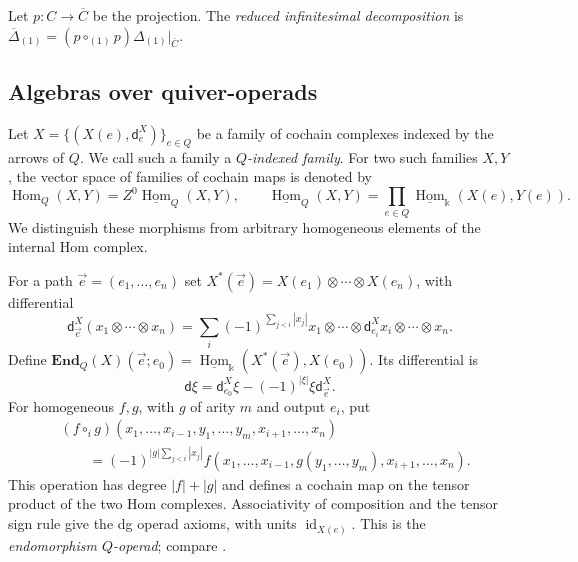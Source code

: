 \documentclass[11pt,letterpaper]{article}
\numberwithin{equation}{section}
\theoremstyle{plain}
\theoremstyle{definition}
\theoremstyle{remark}
\newcommand{\Hom}{\operatorname{Hom}}
\newcommand{\id}{\operatorname{id}}
\begin{document}
Let $p:C\to\overline C$ be the projection. The \textit{reduced infinitesimal decomposition} is
$\overline\Delta_{(1)}=(p\circ_{(1)}p)\Delta_{(1)}|_{\overline C}$.

\subsection{Algebras over quiver-operads}
\label{ss_algebras}
\label{ss_endomrophism_E_operad}
Let $X=\{(X(e),\mathsf d_e^X)\}_{e\in Q}$ be a family of cochain
complexes indexed by the arrows of $Q$. We call such a family a
\textit{$Q$-indexed family}. For two such families $X,Y$, the vector space
of families of cochain maps is denoted by
\begin{equation*} \Hom_Q(X,Y)=Z^0\underline{\operatorname{Hom}}_Q(X,Y),
 \qquad
 \underline{\operatorname{Hom}}_Q(X,Y)
 =\prod_{e\in Q}\underline{\operatorname{Hom}}_{\Bbbk}(X(e),Y(e)).
\end{equation*}
We distinguish these morphisms from arbitrary homogeneous elements of
the internal Hom complex.

For a path $\vec e=(e_1,\ldots,e_n)$ set
$X^*(\vec e)=X(e_1)\otimes\cdots\otimes X(e_n)$, with differential
\begin{equation*} \mathsf d^X_{\vec e}(x_1\otimes\cdots\otimes x_n)
 =\sum_i(-1)^{\sum_{j<i}|x_j|}
 x_1\otimes\cdots\otimes\mathsf d^X_{e_i}x_i\otimes\cdots\otimes x_n.
\end{equation*}
Define
$\mathbf{End}_Q(X)(\vec e;e_0)=
\underline{\operatorname{Hom}}_{\Bbbk}(X^*(\vec e),X(e_0))$.
Its differential is
\begin{equation}\label{widehat_d_eq}
 \mathsf d\xi=\mathsf d^X_{e_0}\xi-(-1)^{|\xi|}\xi\mathsf d^X_{\vec e}.
\end{equation}
For homogeneous $f,g$, with $g$ of arity $m$ and output $e_i$, put
\begin{equation}\label{eq_End_X_hat_composition}
\begin{aligned}
 &(f\circ_i g)(x_1,\ldots,x_{i-1},y_1,\ldots,y_m,x_{i+1},\ldots,x_n)\\
 &\qquad=(-1)^{|g|\sum_{j<i}|x_j|}
 f(x_1,\ldots,x_{i-1},g(y_1,\ldots,y_m),x_{i+1},\ldots,x_n).
\end{aligned}
\end{equation}
This operation has degree $|f|+|g|$ and defines a cochain map on the
tensor product of the two Hom complexes. Associativity of composition
and the tensor sign rule give the dg operad axioms, with units
$\id_{X(e)}$. This is the \textit{endomorphism $Q$-operad}; compare
\cite[Proposition 5.10]{Yuan_higher_operad_Fuk}.
\end{document}
